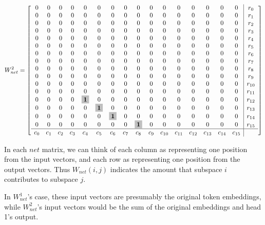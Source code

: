 \documentclass[11pt]{article}
\newenvironment{answerbox}%
  {\begin{mdframed}[linecolor=darkgray,%
                    roundcorner=10pt,innertopmargin=10pt,%
                    innerbottommargin=10pt,skipabove=12pt,skipbelow=12pt]}%
  {\end{mdframed}}
\newcommand{\bigmath}[1]{\colorbox{lightgray}{$\mathbf{#1}$}}
\begin{document}
\begin{itemize}
\begin{answerbox}
$$
W_{net}^2 = \left[
\begin{array}{*{16}c|c}
0 & 0 & 0 & 0 & 0 & 0 & 0 & 0 & 0 & 0 & 0 & 0 & 0 & 0 & 0 & 0 & r_0 \\
0 & 0 & 0 & 0 & 0 & 0 & 0 & 0 & 0 & 0 & 0 & 0 & 0 & 0 & 0 & 0 & r_1 \\
0 & 0 & 0 & 0 & 0 & 0 & 0 & 0 & 0 & 0 & 0 & 0 & 0 & 0 & 0 & 0 & r_2 \\
0 & 0 & 0 & 0 & 0 & 0 & 0 & 0 & 0 & 0 & 0 & 0 & 0 & 0 & 0 & 0 & r_3 \\
0 & 0 & 0 & 0 & 0 & 0 & 0 & 0 & 0 & 0 & 0 & 0 & 0 & 0 & 0 & 0 & r_4 \\
0 & 0 & 0 & 0 & 0 & 0 & 0 & 0 & 0 & 0 & 0 & 0 & 0 & 0 & 0 & 0 & r_5 \\
0 & 0 & 0 & 0 & 0 & 0 & 0 & 0 & 0 & 0 & 0 & 0 & 0 & 0 & 0 & 0 & r_6 \\
0 & 0 & 0 & 0 & 0 & 0 & 0 & 0 & 0 & 0 & 0 & 0 & 0 & 0 & 0 & 0 & r_7 \\
0 & 0 & 0 & 0 & 0 & 0 & 0 & 0 & 0 & 0 & 0 & 0 & 0 & 0 & 0 & 0 & r_8 \\
0 & 0 & 0 & 0 & 0 & 0 & 0 & 0 & 0 & 0 & 0 & 0 & 0 & 0 & 0 & 0 & r_9 \\
0 & 0 & 0 & 0 & 0 & 0 & 0 & 0 & 0 & 0 & 0 & 0 & 0 & 0 & 0 & 0 & r_{10} \\
0 & 0 & 0 & 0 & 0 & 0 & 0 & 0 & 0 & 0 & 0 & 0 & 0 & 0 & 0 & 0 & r_{11} \\
0 & 0 & 0 & 0 & \bigmath{1} & 0 & 0 & 0 & 0 & 0 & 0 & 0 & 0 & 0 & 0 & 0 & r_{12} \\
0 & 0 & 0 & 0 & 0 & \bigmath{1} & 0 & 0 & 0 & 0 & 0 & 0 & 0 & 0 & 0 & 0 & r_{13} \\
0 & 0 & 0 & 0 & 0 & 0 & \bigmath{1} & 0 & 0 & 0 & 0 & 0 & 0 & 0 & 0 & 0 & r_{14} \\
0 & 0 & 0 & 0 & 0 & 0 & 0 & 0 & \bigmath{1} & 0 & 0 & 0 & 0 & 0 & 0 & 0 & r_{15} \\
\hline
c_0 & c_1 & c_2 & c_3 & c_4 & c_5 & c_6 & c_7 & c_8 & c_9 & c_{10} & c_{11} & c_{12} & c_{13} & c_{14} & c_{15} &
\end{array}
\right]
$$

In each $net$ matrix, we can think of each column as representing one position from the input vectors, and each row as representing one position from the output vectors. Thus $W_{net}(i,j)$ indicates the amount that subspace $i$ contributes to subspace $j$.

In $W_{net}^1$'s case, these input vectors are presumably the original token embeddings, while $W_{net}^2$'s input vectors would be the sum of the original embeddings and head 1's output.
    \end{answerbox}


\end{itemize}
\end{document}
